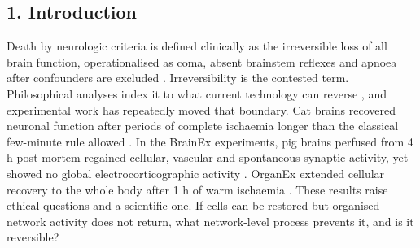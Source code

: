 \documentclass[11pt]{article}
\begin{document}
\vspace{0.6em}
\noindent{}
\clearpage

\subsection{1. Introduction}\label{introduction}

Death by neurologic criteria is defined clinically as the irreversible loss of all brain function, operationalised as coma, absent brainstem reflexes and apnoea after confounders are excluded \cite{greer2020,greer2023}. Irreversibility is the contested term. Philosophical analyses index it to what current technology can reverse \cite{gligorov2023}, and experimental work has repeatedly moved that boundary. Cat brains recovered neuronal function after periods of complete ischaemia longer than the classical few-minute rule allowed \cite{hossmann1973,hossmann1973b}. In the BrainEx experiments, pig brains perfused from 4 h post-mortem regained cellular, vascular and spontaneous synaptic activity, yet showed no global electrocorticographic activity \cite{vrselja2019}. OrganEx extended cellular recovery to the whole body after 1 h of warm ischaemia \cite{andrijevic2022}. These results raise ethical questions \cite{farahany2019,long2025} and a scientific one. If cells can be restored but organised network activity does not return, what network-level process prevents it, and is it reversible?
\end{document}
